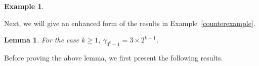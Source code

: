 \documentclass[11pt,draftclsnofoot,onecolumn]{IEEEtran}
\makeatletter
\newcommand{\Rmnum}[1]{\expandafter\@slowromancap\romannumeral #1@}
\newtheorem{lemma}{Lemma}
\newtheorem{example}{Example}
\def\Im{\mathrm{Im}}
\makeatother
\begin{document}
\begin{journalonly}
{\begin{example}
\end{example}

Next, we will  give an enhanced form of the results in Example~\ref{counterexample}.
\begin{lemma}\label{lem:gamma_3^k-1_value}
 For the case $k\geq 1$, $\gamma_{3^{k}-1}=3\times 2^{k-1}$.
  \end{lemma}

 Before proving the above lemma, we first present  the following results.

}
\end{journalonly}
\end{document}
